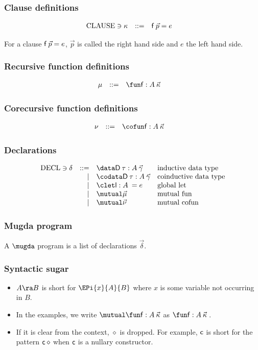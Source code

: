 \subsubsection{Clause definitions}
\[
\begin{array}{lrll}
\operatorname{CLAUSE} \ni \kappa & ::= & \mathsf{f} \: \vec{p} = e & 
\end{array}
\]

\noindent For a clause $\mathsf{f} \: \vec{p} = e$, $\vec{p}$ is called the right hand side and $e$ the left hand side. 

\subsubsection{Recursive function definitions}
\[
\begin{array}{lrll}
\mu & ::= & \fun \ff : A \: \vec{\kappa} & 
\end{array}
\]

\subsubsection{Corecursive function definitions}
\[
\begin{array}{lrll}
\nu & ::= & \cofun \ff : A \: \vec{\kappa} & 
\end{array}
\]

\subsubsection{Declarations}
\[
\begin{array}{lrll}
\Decl \ni \delta & ::= & \data \DD \: \tau : A \: \vec{\gamma} & \mbox{inductive data type}\\ 
& \mid & \codata \DD \: \tau : A \: \vec{\gamma} & \mbox{coinductive data type} \\
& \mid & \clet \dd : A \: = e & \mbox{global let}\\
& \mid & \mutual \vec{\mu} & \mbox{mutual fun }\\
& \mid & \mutual \vec{\nu} & \mbox{mutual cofun}
\end{array}
\]


\subsubsection{Mugda program}
A $\mugda$ program is a list of declarations $\vec{\delta}$.

\subsubsection{Syntactic sugar}
\begin{itemize}
\item
$A \ra B$ is short for $\EPi{x}{A}{B}$ where $x$ is some variable not occurring in $B$.
\item
In the examples, we write $\mutual \fun \ff : A \: \vec{\kappa} $ as $\fun \ff : A \: \vec{\kappa}\:$.
\item
If it is clear from the context, $\diamond$ is dropped. For example, $\mathsf{c}$ is short for the pattern $\mathsf{c} \: \diamond$ when $\mathsf{c}$ is a nullary constructor.
\end{itemize}

